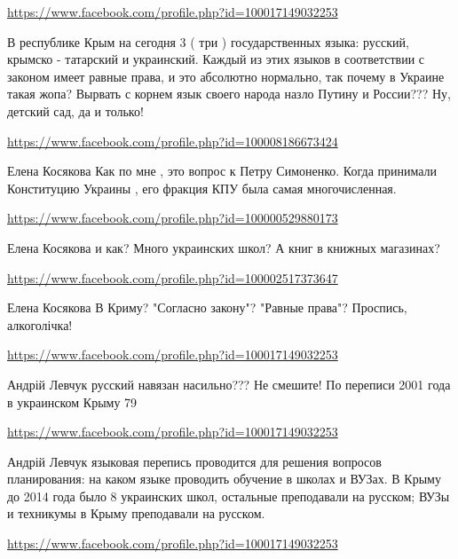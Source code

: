 \documentclass[a4paper,11pt]{extreport}
\begin{document}
\begin{itemize}
\begin{itemize}
\end{itemize}
\url{https://www.facebook.com/profile.php?id=100017149032253}

В республике Крым на сегодня 3 ( три ) государственных языка: русский, крымско - татарский и украинский. Каждый из этих языков в соответствии с законом имеет равные права, и это абсолютно нормально, так почему в Украине такая жопа? Вырвать с корнем язык своего народа назло Путину и России??? Ну, детский сад, да и только!

\begin{itemize}
\url{https://www.facebook.com/profile.php?id=100008186673424}

Елена Косякова Как по мне , это вопрос к Петру Симоненко. Когда принимали Конституцию Украины , его фракция КПУ была самая многочисленная.

\url{https://www.facebook.com/profile.php?id=100000529880173}

Елена Косякова и как? Много украинских школ? А книг в книжных магазинах?

\url{https://www.facebook.com/profile.php?id=100002517373647}

Елена Косякова В Криму? "Согласно закону"? "Равные права"? Проспись, алкоголічка!

\url{https://www.facebook.com/profile.php?id=100017149032253}

Андрій Левчук русский навязан насильно??? Не смешите! По переписи 2001 года в украинском Крыму 79%

\url{https://www.facebook.com/profile.php?id=100017149032253}

Андрій Левчук языковая перепись проводится для решения вопросов планирования: на каком языке проводить обучение в школах и ВУЗах. В Крыму до 2014 года было 8 украинских школ, остальные преподавали на русском; ВУЗы и техникумы в Крыму преподавали на русском.

\end{itemize}
\url{https://www.facebook.com/profile.php?id=100017149032253}


\end{itemize}
\end{document}
